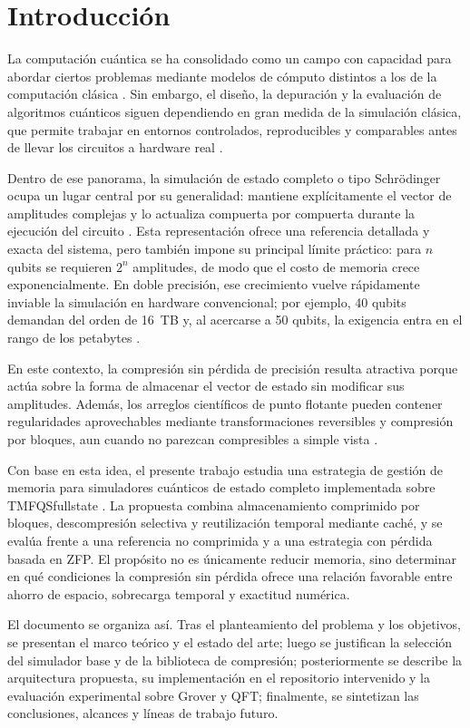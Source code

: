 \section*{Introducción}

La computación cuántica se ha consolidado como un campo con capacidad para abordar ciertos problemas mediante modelos de cómputo distintos a los de la computación clásica \parencite{Nielsen2010}. Sin embargo, el diseño, la depuración y la evaluación de algoritmos cuánticos siguen dependiendo en gran medida de la simulación clásica, que permite trabajar en entornos controlados, reproducibles y comparables antes de llevar los circuitos a hardware real \parencite{Jones2019,diaz2024software}.

Dentro de ese panorama, la simulación de estado completo o tipo Schr\"odinger ocupa un lugar central por su generalidad: mantiene explícitamente el vector de amplitudes complejas y lo actualiza compuerta por compuerta durante la ejecución del circuito \parencite{Jones2019,qiskit_aer_doc}. Esta representación ofrece una referencia detallada y exacta del sistema, pero también impone su principal límite práctico: para $n$ qubits se requieren $2^n$ amplitudes, de modo que el costo de memoria crece exponencialmente. En doble precisión, ese crecimiento vuelve rápidamente inviable la simulación en hardware convencional; por ejemplo, 40 qubits demandan del orden de 16~TB y, al acercarse a 50 qubits, la exigencia entra en el rango de los petabytes \parencite{wu2019full,Haner2017}.

En este contexto, la compresión sin pérdida de precisión resulta atractiva porque actúa
sobre la forma de almacenar el vector de estado sin modificar sus amplitudes. Además,
los arreglos científicos de punto flotante pueden contener regularidades aprovechables
mediante transformaciones reversibles y compresión por bloques, aun cuando no
parezcan compresibles a simple vista \parencite{burtscher2009fpc,lindstrom2006fpzip,masui2015bitshuffle}.

Con base en esta idea, el presente trabajo estudia una estrategia de gestión de memoria
para simuladores cuánticos de estado completo implementada sobre TMFQSfullstate
\parencite{tmfqs_repo}. La propuesta combina almacenamiento comprimido por bloques,
descompresión selectiva y reutilización temporal mediante caché, y se evalúa frente a una
referencia no comprimida y a una estrategia con pérdida basada en ZFP. El propósito no
es únicamente reducir memoria, sino determinar en qué condiciones la compresión sin
pérdida ofrece una relación favorable entre ahorro de espacio, sobrecarga temporal y
exactitud numérica.

El documento se organiza así. Tras el planteamiento del problema y los objetivos, se
presentan el marco teórico y el estado del arte; luego se justifican la selección del
simulador base y de la biblioteca de compresión; posteriormente se describe la
arquitectura propuesta, su implementación en el repositorio intervenido y la evaluación
experimental sobre Grover y QFT; finalmente, se sintetizan las conclusiones, alcances y
líneas de trabajo futuro.
